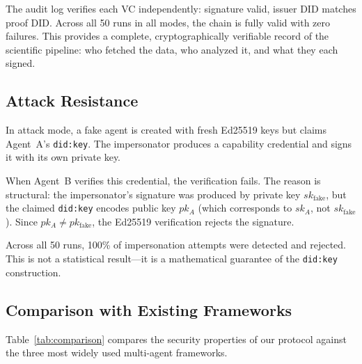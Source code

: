 \documentclass[11pt]{article}
\newcommand{\didkey}{\texttt{did:key}}
\begin{document}
The audit log verifies each VC independently: signature valid, issuer DID matches proof DID. Across all 50 runs in all modes, the chain is fully valid with zero failures. This provides a complete, cryptographically verifiable record of the scientific pipeline: who fetched the data, who analyzed it, and what they each signed.

\subsection{Attack Resistance}

In attack mode, a fake agent is created with fresh Ed25519 keys but claims Agent~A's \didkey{}. The impersonator produces a capability credential and signs it with its own private key.

When Agent~B verifies this credential, the verification fails. The reason is structural: the impersonator's signature was produced by private key $sk_{\text{fake}}$, but the claimed \didkey{} encodes public key $pk_A$ (which corresponds to $sk_A$, not $sk_{\text{fake}}$). Since $pk_A \neq pk_{\text{fake}}$, the Ed25519 verification rejects the signature.

Across all 50 runs, 100\% of impersonation attempts were detected and rejected. This is not a statistical result---it is a mathematical guarantee of the \didkey{} construction.

\subsection{Comparison with Existing Frameworks}

Table~\ref{tab:comparison} compares the security properties of our protocol against the three most widely used multi-agent frameworks.
\end{document}
